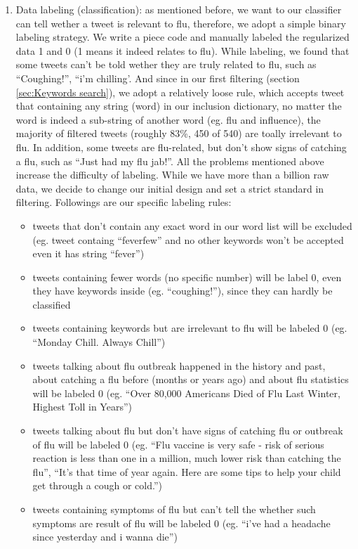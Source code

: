 \begin{enumerate}
    \item Data labeling (classification): as mentioned before, we want to our classifier can tell wether a tweet is relevant to flu, therefore, we adopt a simple binary labeling strategy. We write a piece code and manually labeled the regularized data 1 and 0 (1 means it indeed relates to flu). While labeling, we found that some tweets can't be told wether they are truly related to flu, such as ``Coughing!'', ``i'm chilling'. And since in our first filtering (section \ref{sec:Keywords search}), we adopt a relatively loose rule, which accepts tweet that containing any string (word) in our inclusion dictionary, no matter the word is indeed a sub-string of another word (eg. flu and influence), the majority of filtered tweets (roughly 83\%, 450 of 540) are toally irrelevant to flu. In addition, some tweets are flu-related, but don't show signs of catching a flu, such as ``Just had my flu jab!''. All the problems mentioned above increase the difficulty of labeling. While we have more than a billion raw data, we decide to change our initial design and set a strict standard in filtering. Followings are our specific labeling rules: 
    \begin{itemize}
        \item tweets that don't contain any exact word in our word list will be excluded (eg. tweet containg ``feverfew'' and no other keywords won't be accepted even it has string ``fever'')
        \item tweets containing fewer words (no specific number) will be label 0, even they have keywords inside (eg. ``coughing!''), since they can hardly be classified
        \item tweets containing keywords but are irrelevant to flu will be labeled 0 (eg. ``Monday Chill. Always Chill'')
        \item tweets talking about flu outbreak happened in the history and past, about catching a flu before (months or years ago) and about flu statistics will be labeled 0 (eg. ``Over 80,000 Americans Died of Flu Last Winter, Highest Toll in Years'')
        \item tweets talking about flu but don't have signs of catching flu or outbreak of flu will be labeled 0 (eg. ``Flu vaccine is very safe - risk of serious reaction is less than one in a million, much lower risk than catching the flu'', ``It's that time of year again. Here are some tips to help your child get through a cough or cold.'')
        \item tweets containing symptoms of flu but can't tell the whether such symptoms are result of flu will be labeled 0 (eg. ``i’ve had a headache since yesterday and i wanna die'')

\end{itemize}
\end{enumerate}
